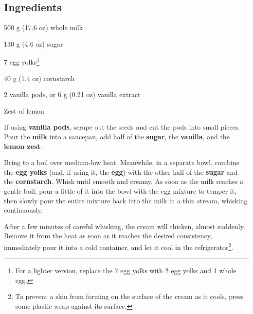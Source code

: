 \newpage
{}

\subsection*{Ingredients}
\begin{ingredients}
	\item 500 g (17.6 oz) whole milk
	\item 130 g (4.6 oz) sugar
	\item 7 egg yolks\footnote{For a lighter version, replace the 7 egg yolks with 2 egg yolks and 1 whole egg.}
	\item 40 g (1.4 oz) cornstarch
	\item 2 vanilla pods, or 6 g (0.21 oz) vanilla extract
	\item Zest of  lemon
\end{ingredients}

\medskip

If using \textbf{vanilla pods}, scrape out the seeds and cut the pods into small pieces.
Pour the \textbf{milk} into a saucepan, add half of the \textbf{sugar}, the \textbf{vanilla}, and the \textbf{lemon zest}.

Bring to a boil over medium-low heat.
Meanwhile, in a separate bowl, combine the \textbf{egg yolks} (and, if using it, the \textbf{egg}) with the other half of the \textbf{sugar} and the \textbf{cornstarch}.
Whisk until smooth and creamy.
As soon as the milk reaches a gentle boil, pour a little of it into the bowl with the egg mixture to temper it, then slowly pour the entire mixture back into the milk in a thin stream, whisking continuously.

After a few minutes of careful whisking, the cream will thicken, almost suddenly.
Remove it from the heat as soon as it reaches the desired consistency, immediately pour it into a cold container, and let it cool in the refrigerator\footnote{To prevent a skin from forming on the surface of the cream as it cools, press some plastic wrap against its surface.}.


\vspace*{0.75 cm}

\begin{recipeblock}
	
\end{recipeblock}